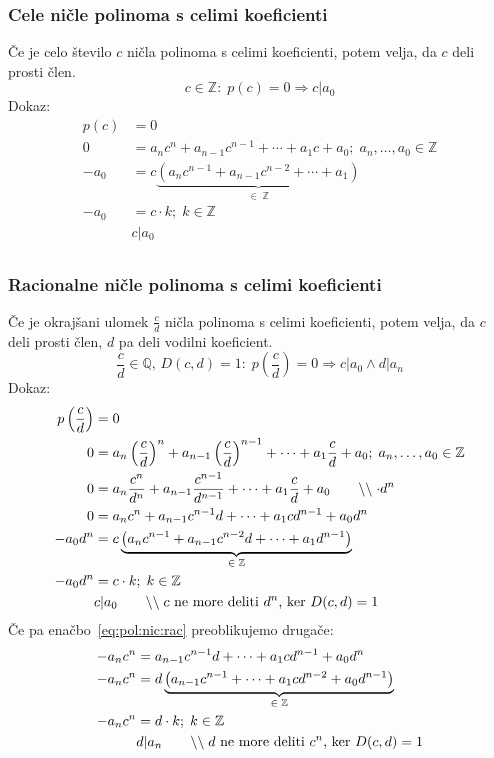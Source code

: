 \documentclass[a4paper,oneside,12pt,fleqn]{article}
\def\Z{\ensuremath{\mathbb Z}}
\def\Q{\ensuremath{\mathbb Q}}
\newcommand\krat\cdot
\newcommand{\comment}[1]{\ensuremath{\qquad\backslash\backslash\;}\textnormal{#1}}
\renewcommand\implies\Rightarrow
\numberwithin{equation}{section}
\begin{document}
\subsubsection{Cele ničle polinoma s celimi koeficienti}
\label{sec:pol:nic:cel}
Če je celo število $c$ ničla polinoma s celimi koeficienti, potem velja, da $c$ deli
prosti člen.
\[ c \in \Z\!:\;p(c) = 0 \implies c|a_0 \]
Dokaz:
\begin{align*}
  p(c) &= 0 \\
  0 &= a_nc^n+a_{n-1}c^{n-1}+\cdots+a_1c+a_0; \; a_n,\ldots,a_0 \in \Z \\
  -a_0 &= c\underbrace{\left(a_nc^{n-1} + a_{n-1}c^{n-2} +\cdots+a_1\right)}_{\in\;\Z} \\
  -a_0 &= c \krat k; \; k \in \Z \\
  &c | a_0 \\
\end{align*}

\subsubsection{Racionalne ničle polinoma s celimi koeficienti}
\label{sec:pol:nic:rac}
Če je okrajšani ulomek $\frac{c}{d}$ ničla polinoma s celimi koeficienti, potem velja, da $c$ deli
prosti člen, $d$ pa deli vodilni koeficient.
\[ \frac{c}{d} \in \Q,\,D(c,d)=1\!:\;p\left( \frac{c}{d} \right) = 0 \implies
c|a_0 \land d|a_n \]
Dokaz:
\begin{align}
  p\left(\frac{c}{d}\right) &= 0 \nonumber \\
  0 &= a_n\left(\frac{c}{d}\right)^n+a_{n-1}\left(\frac{c}{d}\right)^{n-1}+\cdots+a_1\frac{c}{d}+a_0; \; a_n,\ldots,a_0 \in \Z \nonumber \\
  0 &= a_n\frac{c^n}{d^n}+a_{n-1}\frac{c^{n-1}}{d^{n-1}}+\cdots+a_1\frac{c}{d}+a_0
  \comment{$\krat d^n$} \nonumber \\
  0 &= a_nc^n+a_{n-1}c^{n-1}d+\cdots+a_1cd^{n-1}+a_0d^n \label{eq:pol:nic:rac} \\
  -a_0d^n &= c\underbrace{\left(a_nc^{n-1}+a_{n-1}c^{n-2}d+\cdots+a_1d^{n-1}\right)}_{\in\;\Z} \nonumber \\
  -a_0d^n &= c \krat k; \; k \in \Z \nonumber \\
  & c|a_0 \comment{$c$ ne more deliti $d^n$, ker $D(c,d)=1$} \nonumber
\end{align}
Če pa enačbo~\eqref{eq:pol:nic:rac} preoblikujemo drugače:
\begin{align*}
  -a_nc^n &= a_{n-1}c^{n-1}d+\cdots+a_1cd^{n-1}+a_0d^n \\
  -a_nc^n &= d\underbrace{\left(a_{n-1}c^{n-1}+\cdots+a_1cd^{n-2}+a_0d^{n-1}\right)}_{\in\;\Z} \\
  -a_nc^n &= d \krat k; \; k \in \Z \\
  & d|a_n \comment{$d$ ne more deliti $c^n$, ker $D(c,d)=1$}
\end{align*}
\end{document}
